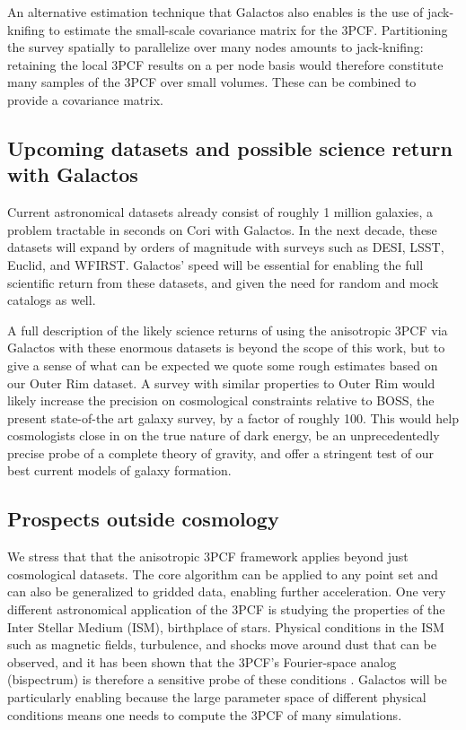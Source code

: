 An alternative estimation technique that Galactos also enables is the use of jack-knifing to estimate the small-scale covariance matrix for the 3PCF. Partitioning the survey spatially to parallelize over many nodes amounts to jack-knifing: retaining the local 3PCF results on a per node basis would therefore constitute many samples of the 3PCF over small volumes. These can be combined to provide a covariance matrix. 

\subsection{Upcoming datasets and possible science return with Galactos}

Current astronomical datasets already consist of roughly 1 million galaxies, a problem tractable in seconds on Cori with Galactos. In the next decade, these datasets will expand by orders of magnitude with surveys such as DESI, LSST, Euclid, and WFIRST. Galactos' speed will be essential for enabling the full scientific return from these datasets, and given the need for random and mock catalogs as well. 

A full description of the likely science returns of using the anisotropic 3PCF via Galactos with these enormous datasets is beyond the scope of this work, but to give a sense of what can be expected we quote some rough estimates based on our Outer Rim dataset. A survey with similar properties to Outer Rim would likely increase the precision on cosmological constraints relative to BOSS, the present state-of-the art galaxy survey, by a factor of roughly 100.  This would help cosmologists close in on the true nature of dark energy, be an unprecedentedly precise probe of a complete theory of gravity, and offer a stringent test of our best current models of galaxy formation.


\subsection{Prospects outside cosmology}
We stress that that the anisotropic 3PCF framework applies beyond just cosmological datasets. The core algorithm can be applied to any point set and can also be generalized to gridded data, enabling further acceleration. One very different astronomical application of the 3PCF is studying the properties of the Inter Stellar Medium (ISM), birthplace of stars. 
Physical conditions in the ISM such as magnetic fields, turbulence, and shocks move around dust that can be observed, and it has been shown that the 3PCF's Fourier-space analog (bispectrum) is therefore a sensitive probe of these conditions \cite{Burkhart09}. Galactos will be particularly enabling because the large parameter space of different physical conditions means one needs to compute the 3PCF of many simulations.

